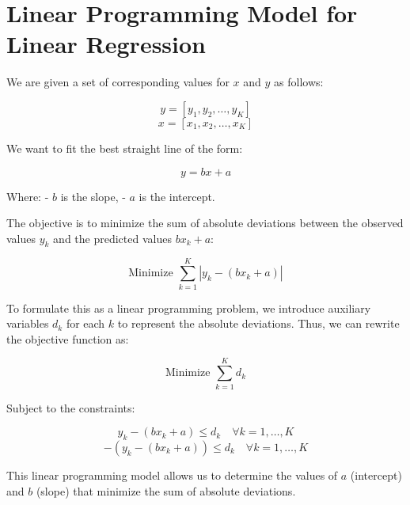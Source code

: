 \documentclass{article}
\begin{document}
\section*{Linear Programming Model for Linear Regression}

We are given a set of corresponding values for \( x \) and \( y \) as follows:

\[
y = [y_{1}, y_{2}, \ldots, y_{K}]
\]
\[
x = [x_{1}, x_{2}, \ldots, x_{K}]
\]

We want to fit the best straight line of the form:

\[
y = bx + a
\]

Where:
- \( b \) is the slope,
- \( a \) is the intercept.

The objective is to minimize the sum of absolute deviations between the observed values \( y_k \) and the predicted values \( bx_k + a \):

\[
\text{Minimize } \sum_{k=1}^{K} |y_k - (bx_k + a)|
\]

To formulate this as a linear programming problem, we introduce auxiliary variables \( d_k \) for each \( k \) to represent the absolute deviations. Thus, we can rewrite the objective function as:

\[
\text{Minimize } \sum_{k=1}^{K} d_k
\]

Subject to the constraints:

\[
y_k - (bx_k + a) \leq d_k \quad \forall k = 1, \ldots, K
\]
\[
-(y_k - (bx_k + a)) \leq d_k \quad \forall k = 1, \ldots, K
\]

This linear programming model allows us to determine the values of \( a \) (intercept) and \( b \) (slope) that minimize the sum of absolute deviations.
\end{document}
